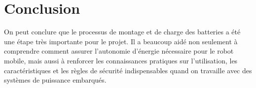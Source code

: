 \section{Conclusion}

On peut conclure que le processus de montage et de charge des batteries a été une étape très importante pour le projet. Il a beaucoup aidé non seulement à comprendre comment assurer l’autonomie d’énergie nécessaire pour le robot mobile, mais aussi à renforcer les connaissances pratiques sur l’utilisation, les caractéristiques et les règles de sécurité indispensables quand on travaille avec des systèmes de puissance embarqués.